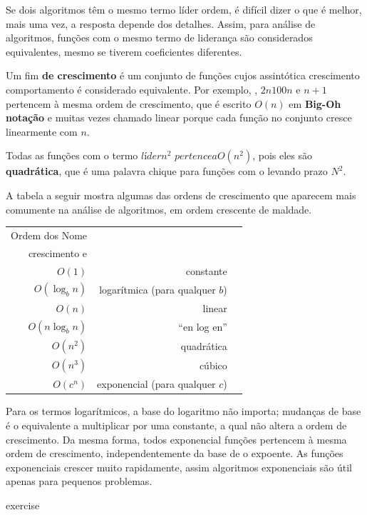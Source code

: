 \documentclass[10pt]{book}
\begin{document}
\begin{exercise}
\begin{v erbatim}
Se dois algoritmos têm o mesmo termo líder ordem, é difícil dizer
o que é melhor, mais uma vez, a resposta depende dos detalhes. Assim, para
análise de algoritmos, funções com o mesmo termo de liderança
são considerados equivalentes, mesmo se tiverem coeficientes diferentes.

Um fim {\bf de crescimento} é um conjunto de funções cujos assintótica crescimento
comportamento é considerado equivalente. Por exemplo, $ $, $ 2n 100n $ e $ n +1 $
pertencem à mesma ordem de crescimento, que é escrito $ O (n) $ em
{\bf Big-Oh notação} e muitas vezes chamado {linear \bf} porque cada função
no conjunto cresce linearmente com $ n $.

Todas as funções com o termo $ líder n ^ 2 $ $ pertence a O (n ^ 2) $, pois eles são
{\bf quadrática}, que é uma palavra chique para funções com o
levando prazo $ N ^ 2 $.

A tabela a seguir mostra algumas das ordens de crescimento que
aparecem mais comumente na análise de algoritmos,
em ordem crescente de maldade.

\begin{tabular} {| r | r | r |}
\hline
Ordem dos Nome & \\
crescimento e \\
\hline
$ O (1) $ & constante \\
$ O (\log_b n) $ & logarítmica (para qualquer $ b $) \\
$ O (n) $ & linear \\
$ O (n \log_b n) $ & ``en log en'' \\
$ O (n ^ 2) $ & quadrática \\
$ O (n ^ 3) $ & cúbico \\
$ O (c ^ n) $ & exponencial (para qualquer $ c $) \\
\hline
\end{tabular}

Para os termos logarítmicos, a base do logaritmo não importa;
mudanças de base é o equivalente a multiplicar por uma constante, a qual
não altera a ordem de crescimento. Da mesma forma, todos exponencial
funções pertencem à mesma ordem de crescimento, independentemente da base de
o expoente.
As funções exponenciais crescer muito rapidamente, assim algoritmos exponenciais são
útil apenas para pequenos problemas.


\begin{} exercise


\end{}
\end{v erbatim}
\end{exercise}
\end{document}
